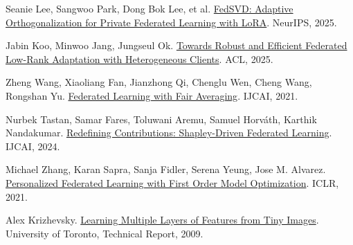 \documentclass[UTF8,a4paper,10pt,fontset=fandol]{ctexart}
\begin{document}
{\small\noindent [15] Seanie Lee, Sangwoo Park, Dong Bok Lee, et al. \href{https://arxiv.org/abs/2505.12805}{FedSVD: Adaptive Orthogonalization for Private Federated Learning with LoRA}. NeurIPS, 2025.\par}

{\small\noindent [16] Jabin Koo, Minwoo Jang, Jungseul Ok. \href{https://aclanthology.org/2025.acl-long.19/}{Towards Robust and Efficient Federated Low-Rank Adaptation with Heterogeneous Clients}. ACL, 2025.\par}

{\small\noindent [17] Zheng Wang, Xiaoliang Fan, Jianzhong Qi, Chenglu Wen, Cheng Wang, Rongshan Yu. \href{https://www.ijcai.org/proceedings/2021/223}{Federated Learning with Fair Averaging}. IJCAI, 2021.\par}

{\small\noindent [18] Nurbek Tastan, Samar Fares, Toluwani Aremu, Samuel Horváth, Karthik Nandakumar. \href{https://www.ijcai.org/proceedings/2024/554}{Redefining Contributions: Shapley-Driven Federated Learning}. IJCAI, 2024.\par}

{\small\noindent [19] Michael Zhang, Karan Sapra, Sanja Fidler, Serena Yeung, Jose M. Alvarez. \href{https://arxiv.org/abs/2012.08565}{Personalized Federated Learning with First Order Model Optimization}. ICLR, 2021.\par}

{\small\noindent [20] Alex Krizhevsky. \href{https://www.cs.toronto.edu/~kriz/learning-features-2009-TR.pdf}{Learning Multiple Layers of Features from Tiny Images}. University of Toronto, Technical Report, 2009.\par}
\end{document}
